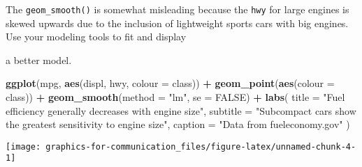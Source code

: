 \documentclass[]{book}
\newenvironment{Shaded}{\begin{snugshade}}{\end{snugshade}}
\newcommand{\DataTypeTok}[1]{\textcolor[rgb]{0.13,0.29,0.53}{#1}}
\newcommand{\KeywordTok}[1]{\textcolor[rgb]{0.13,0.29,0.53}{\textbf{#1}}}
\newcommand{\NormalTok}[1]{#1}
\newcommand{\OperatorTok}[1]{\textcolor[rgb]{0.81,0.36,0.00}{\textbf{#1}}}
\newcommand{\OtherTok}[1]{\textcolor[rgb]{0.56,0.35,0.01}{#1}}
\newcommand{\StringTok}[1]{\textcolor[rgb]{0.31,0.60,0.02}{#1}}
\theoremstyle{plain}
\theoremstyle{remark}
\begin{document}
The \texttt{geom\_smooth()} is somewhat misleading because the
\texttt{hwy} for large engines is skewed upwards due to the inclusion of
lightweight sports cars with big engines. Use your modeling tools to fit
and display

a better model.

\begin{Shaded}
\begin{Highlighting}[]
\KeywordTok{ggplot}\NormalTok{(mpg, }\KeywordTok{aes}\NormalTok{(displ, hwy, }\DataTypeTok{colour =}\NormalTok{ class)) }\OperatorTok{+}
\StringTok{  }\KeywordTok{geom_point}\NormalTok{(}\KeywordTok{aes}\NormalTok{(}\DataTypeTok{colour =}\NormalTok{ class)) }\OperatorTok{+}
\StringTok{  }\KeywordTok{geom_smooth}\NormalTok{(}\DataTypeTok{method =} \StringTok{"lm"}\NormalTok{, }\DataTypeTok{se =} \OtherTok{FALSE}\NormalTok{) }\OperatorTok{+}
\StringTok{  }\KeywordTok{labs}\NormalTok{(}
    \DataTypeTok{title =} \StringTok{"Fuel efficiency generally decreases with engine size"}\NormalTok{,}
    \DataTypeTok{subtitle =} \StringTok{"Subcompact cars show the greatest sensitivity to engine size"}\NormalTok{,}
    \DataTypeTok{caption =} \StringTok{"Data from fueleconomy.gov"}
\NormalTok{  )}
\end{Highlighting}
\end{Shaded}

\begin{center}\texttt{[image: graphics-for-communication\_files/figure-latex/unnamed-chunk-4-1]} \end{center}

\begin{Shaded}
\end{Shaded}
\end{document}
